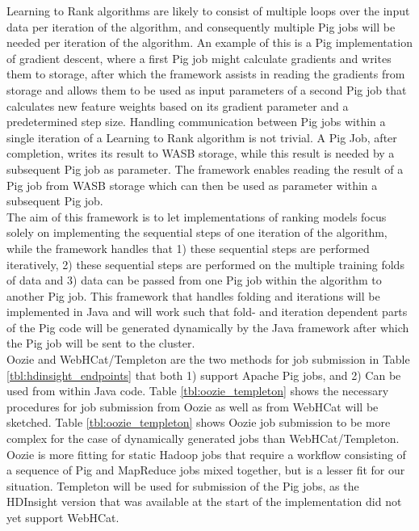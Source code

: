 Learning to Rank algorithms are likely to consist of multiple loops over the input data per iteration of the algorithm, and consequently multiple Pig jobs will be needed per iteration of the algorithm. An example of this is a Pig implementation of gradient descent, where a first Pig job might calculate gradients and writes them to storage, after which the framework assists in reading the gradients from storage and allows them to be used as input parameters of a second Pig job that calculates new feature weights based on its gradient parameter and a predetermined step size. Handling communication between Pig jobs within a single iteration of a Learning to Rank algorithm is not trivial. A Pig Job, after completion, writes its result to \ac{WASB} storage, while this result is needed by a subsequent Pig job as parameter. The framework enables reading the result of a Pig job from \ac{WASB} storage which can then be used as parameter within a subsequent Pig job. \\

The aim of this framework is to let implementations of ranking models focus solely on implementing the sequential steps of one iteration of the algorithm, while the framework handles that 1) these sequential steps are performed iteratively, 2) these sequential steps are performed on the multiple training folds of data and 3) data can be passed from one Pig job within the algorithm to another Pig job. This framework that handles folding and iterations will be implemented in Java and will work such that fold- and iteration dependent parts of the Pig code will be generated dynamically by the Java framework after which the Pig job will be sent to the cluster.\\

Oozie and WebHCat/Templeton are the two methods for job submission in Table \ref{tbl:hdinsight_endpoints} that both 1) support Apache Pig jobs, and 2) Can be used from within Java code. Table \ref{tbl:oozie_templeton} shows the necessary procedures for job submission from Oozie as well as from WebHCat will be sketched. Table \ref{tbl:oozie_templeton} shows Oozie job submission to be more complex for the case of dynamically generated jobs than WebHCat/Templeton. Oozie is more fitting for static Hadoop jobs that require a workflow consisting of a sequence of Pig and MapReduce jobs mixed together, but is a lesser fit for our situation. Templeton will be used for submission of the Pig jobs, as the HDInsight version that was available at the start of the implementation did not yet support WebHCat.\\

